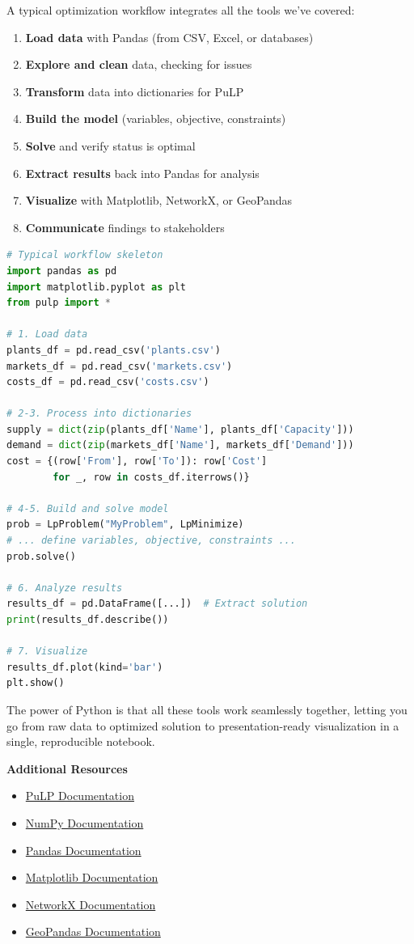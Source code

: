 A typical optimization workflow integrates all the tools we've covered:

\begin{enumerate}
\item \textbf{Load data} with Pandas (from CSV, Excel, or databases)
\item \textbf{Explore and clean} data, checking for issues
\item \textbf{Transform} data into dictionaries for PuLP
\item \textbf{Build the model} (variables, objective, constraints)
\item \textbf{Solve} and verify status is optimal
\item \textbf{Extract results} back into Pandas for analysis
\item \textbf{Visualize} with Matplotlib, NetworkX, or GeoPandas
\item \textbf{Communicate} findings to stakeholders
\end{enumerate}

\begin{lstlisting}[language=Python]
# Typical workflow skeleton
import pandas as pd
import matplotlib.pyplot as plt
from pulp import *

# 1. Load data
plants_df = pd.read_csv('plants.csv')
markets_df = pd.read_csv('markets.csv')
costs_df = pd.read_csv('costs.csv')

# 2-3. Process into dictionaries
supply = dict(zip(plants_df['Name'], plants_df['Capacity']))
demand = dict(zip(markets_df['Name'], markets_df['Demand']))
cost = {(row['From'], row['To']): row['Cost']
        for _, row in costs_df.iterrows()}

# 4-5. Build and solve model
prob = LpProblem("MyProblem", LpMinimize)
# ... define variables, objective, constraints ...
prob.solve()

# 6. Analyze results
results_df = pd.DataFrame([...])  # Extract solution
print(results_df.describe())

# 7. Visualize
results_df.plot(kind='bar')
plt.show()
\end{lstlisting}

The power of Python is that all these tools work seamlessly together, letting you go from raw data to optimized solution to presentation-ready visualization in a single, reproducible notebook.

\begin{resource}
\textbf{Additional Resources}
\begin{itemize}
\item \href{https://coin-or.github.io/pulp/}{PuLP Documentation}
\item \href{https://numpy.org/doc/}{NumPy Documentation}
\item \href{https://pandas.pydata.org/docs/}{Pandas Documentation}
\item \href{https://matplotlib.org/stable/contents.html}{Matplotlib Documentation}
\item \href{https://networkx.org/documentation/}{NetworkX Documentation}
\item \href{https://geopandas.org/}{GeoPandas Documentation}
\end{itemize}
\end{resource}

